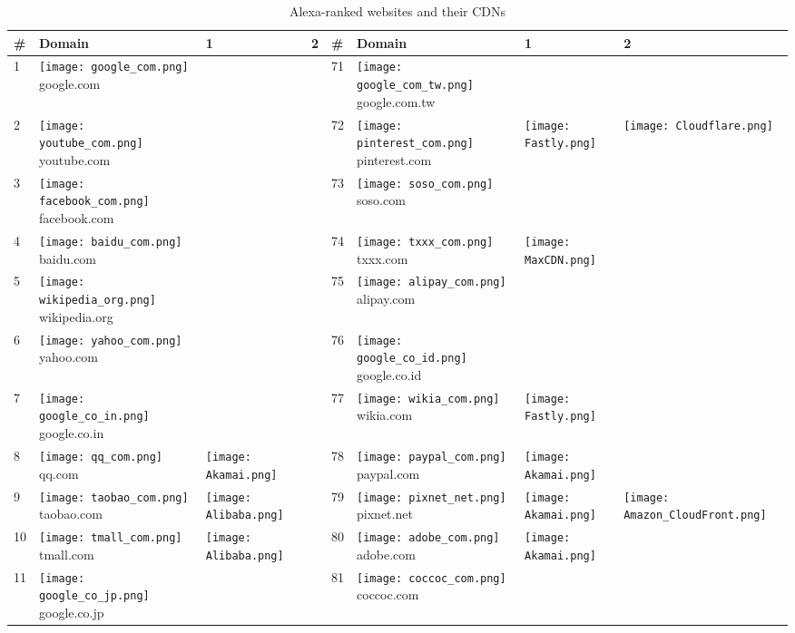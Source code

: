 \begin{table}[]
\centering
\caption{Alexa-ranked websites and their CDNs}
\label{cdn-table}
\begin{tabular}{|llll|llll|}
\hline
\# & Domain & 1 & 2 & \# & Domain & 1 & 2 \\
\hline
1 & \texttt{[image: google\_com.png]} google.com & & & 71 & \texttt{[image: google\_com\_tw.png]} google.com.tw & & \\
2 & \texttt{[image: youtube\_com.png]} youtube.com & & & 72 & \texttt{[image: pinterest\_com.png]} pinterest.com & \texttt{[image: Fastly.png]} & \texttt{[image: Cloudflare.png]} \\
3 & \texttt{[image: facebook\_com.png]} facebook.com & & & 73 & \texttt{[image: soso\_com.png]} soso.com & & \\
4 & \texttt{[image: baidu\_com.png]} baidu.com & & & 74 & \texttt{[image: txxx\_com.png]} txxx.com & \texttt{[image: MaxCDN.png]} & \\
5 & \texttt{[image: wikipedia\_org.png]} wikipedia.org & & & 75 & \texttt{[image: alipay\_com.png]} alipay.com & & \\
6 & \texttt{[image: yahoo\_com.png]} yahoo.com & & & 76 & \texttt{[image: google\_co\_id.png]} google.co.id & & \\
7 & \texttt{[image: google\_co\_in.png]} google.co.in & & & 77 & \texttt{[image: wikia\_com.png]} wikia.com & \texttt{[image: Fastly.png]} & \\
8 & \texttt{[image: qq\_com.png]} qq.com & \texttt{[image: Akamai.png]} & & 78 & \texttt{[image: paypal\_com.png]} paypal.com & \texttt{[image: Akamai.png]} & \\
9 & \texttt{[image: taobao\_com.png]} taobao.com & \texttt{[image: Alibaba.png]} & & 79 & \texttt{[image: pixnet\_net.png]} pixnet.net & \texttt{[image: Akamai.png]} & \texttt{[image: Amazon\_CloudFront.png]} \\
10 & \texttt{[image: tmall\_com.png]} tmall.com & \texttt{[image: Alibaba.png]} & & 80 & \texttt{[image: adobe\_com.png]} adobe.com & \texttt{[image: Akamai.png]} & \\
11 & \texttt{[image: google\_co\_jp.png]} google.co.jp & & & 81 & \texttt{[image: coccoc\_com.png]} coccoc.com & & \\

\end{tabular}
\end{table}
